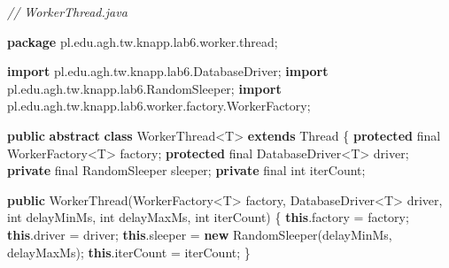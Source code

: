 \documentclass[11pt]{article}
\newenvironment{Shaded}{}{}
\newcommand{\KeywordTok}[1]{\textcolor[rgb]{0.00,0.44,0.13}{\textbf{{#1}}}}
\newcommand{\DataTypeTok}[1]{\textcolor[rgb]{0.56,0.13,0.00}{{#1}}}
\newcommand{\CommentTok}[1]{\textcolor[rgb]{0.38,0.63,0.69}{\textit{{#1}}}}
\newcommand{\FunctionTok}[1]{\textcolor[rgb]{0.02,0.16,0.49}{{#1}}}
\newcommand{\NormalTok}[1]{{#1}}
\newcommand{\ImportTok}[1]{{#1}}
\newcommand{\OperatorTok}[1]{\textcolor[rgb]{0.40,0.40,0.40}{{#1}}}
\newcommand{\BuiltInTok}[1]{{#1}}
\begin{document}
\begin{Shaded}
\begin{Highlighting}[]
\CommentTok{// WorkerThread.java}

\KeywordTok{package}\ImportTok{ pl}\OperatorTok{.}\ImportTok{edu}\OperatorTok{.}\ImportTok{agh}\OperatorTok{.}\ImportTok{tw}\OperatorTok{.}\ImportTok{knapp}\OperatorTok{.}\ImportTok{lab6}\OperatorTok{.}\ImportTok{worker}\OperatorTok{.}\ImportTok{thread}\OperatorTok{;}

\KeywordTok{import} \ImportTok{pl}\OperatorTok{.}\ImportTok{edu}\OperatorTok{.}\ImportTok{agh}\OperatorTok{.}\ImportTok{tw}\OperatorTok{.}\ImportTok{knapp}\OperatorTok{.}\ImportTok{lab6}\OperatorTok{.}\ImportTok{DatabaseDriver}\OperatorTok{;}
\KeywordTok{import} \ImportTok{pl}\OperatorTok{.}\ImportTok{edu}\OperatorTok{.}\ImportTok{agh}\OperatorTok{.}\ImportTok{tw}\OperatorTok{.}\ImportTok{knapp}\OperatorTok{.}\ImportTok{lab6}\OperatorTok{.}\ImportTok{RandomSleeper}\OperatorTok{;}
\KeywordTok{import} \ImportTok{pl}\OperatorTok{.}\ImportTok{edu}\OperatorTok{.}\ImportTok{agh}\OperatorTok{.}\ImportTok{tw}\OperatorTok{.}\ImportTok{knapp}\OperatorTok{.}\ImportTok{lab6}\OperatorTok{.}\ImportTok{worker}\OperatorTok{.}\ImportTok{factory}\OperatorTok{.}\ImportTok{WorkerFactory}\OperatorTok{;}

\KeywordTok{public} \KeywordTok{abstract} \KeywordTok{class}\NormalTok{ WorkerThread}\OperatorTok{\textless{}}\NormalTok{T}\OperatorTok{\textgreater{}} \KeywordTok{extends} \BuiltInTok{Thread} \OperatorTok{\{}
    \KeywordTok{protected} \DataTypeTok{final}\NormalTok{ WorkerFactory}\OperatorTok{\textless{}}\NormalTok{T}\OperatorTok{\textgreater{}}\NormalTok{ factory}\OperatorTok{;}
    \KeywordTok{protected} \DataTypeTok{final}\NormalTok{ DatabaseDriver}\OperatorTok{\textless{}}\NormalTok{T}\OperatorTok{\textgreater{}}\NormalTok{ driver}\OperatorTok{;}
    \KeywordTok{private} \DataTypeTok{final}\NormalTok{ RandomSleeper sleeper}\OperatorTok{;}
    \KeywordTok{private} \DataTypeTok{final} \DataTypeTok{int}\NormalTok{ iterCount}\OperatorTok{;}

    \KeywordTok{public} \FunctionTok{WorkerThread}\OperatorTok{(}\NormalTok{WorkerFactory}\OperatorTok{\textless{}}\NormalTok{T}\OperatorTok{\textgreater{}}\NormalTok{ factory}\OperatorTok{,}\NormalTok{ DatabaseDriver}\OperatorTok{\textless{}}\NormalTok{T}\OperatorTok{\textgreater{}}\NormalTok{ driver}\OperatorTok{,}
                        \DataTypeTok{int}\NormalTok{ delayMinMs}\OperatorTok{,} \DataTypeTok{int}\NormalTok{ delayMaxMs}\OperatorTok{,} \DataTypeTok{int}\NormalTok{ iterCount}\OperatorTok{)}
    \OperatorTok{\{}
        \KeywordTok{this}\OperatorTok{.}\FunctionTok{factory} \OperatorTok{=}\NormalTok{ factory}\OperatorTok{;}
        \KeywordTok{this}\OperatorTok{.}\FunctionTok{driver} \OperatorTok{=}\NormalTok{ driver}\OperatorTok{;}
        \KeywordTok{this}\OperatorTok{.}\FunctionTok{sleeper} \OperatorTok{=} \KeywordTok{new} \FunctionTok{RandomSleeper}\OperatorTok{(}\NormalTok{delayMinMs}\OperatorTok{,}\NormalTok{ delayMaxMs}\OperatorTok{);}
        \KeywordTok{this}\OperatorTok{.}\FunctionTok{iterCount} \OperatorTok{=}\NormalTok{ iterCount}\OperatorTok{;}
    \OperatorTok{\}}


\end{Highlighting}
\end{Shaded}
\end{document}
